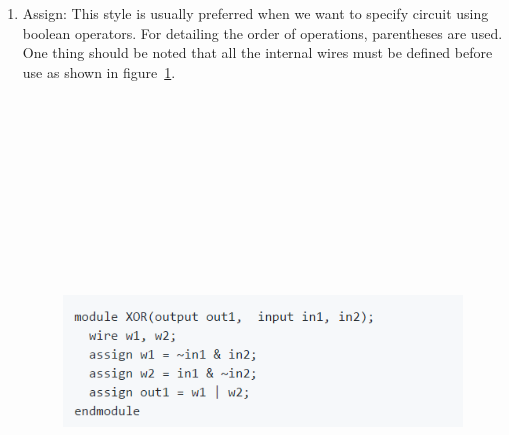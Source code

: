 \documentclass[11pt]{article}
\begin{document}
\begin{enumerate}
\item Assign: 
This style is usually preferred when we want to specify circuit using boolean operators. For detailing the order of operations, parentheses are used. One thing should be noted that all the internal wires must be defined before use as shown in figure~\ref{Assign statements exmaple}.\bigskip
\begin{figure}[ht!]
\centering
\includegraphics[width=11cm,height=14cm,keepaspectratio]{assign.png}
\label{Assign statements exmaple}
\end{figure}


\end{enumerate}
\end{document}
